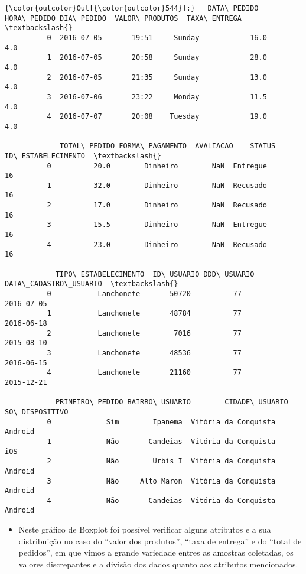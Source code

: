 \documentclass[11pt]{article}
\providecommand{\tightlist}{%
      \setlength{\itemsep}{0pt}\setlength{\parskip}{0pt}}
\begin{document}
\begin{Verbatim}[commandchars=\\\{\}]
{\color{outcolor}Out[{\color{outcolor}544}]:}   DATA\_PEDIDO HORA\_PEDIDO DIA\_PEDIDO  VALOR\_PRODUTOS  TAXA\_ENTREGA  \textbackslash{}
          0  2016-07-05       19:51     Sunday            16.0           4.0   
          1  2016-07-05       20:58     Sunday            28.0           4.0   
          2  2016-07-05       21:35     Sunday            13.0           4.0   
          3  2016-07-06       23:22     Monday            11.5           4.0   
          4  2016-07-07       20:08    Tuesday            19.0           4.0   
          
             TOTAL\_PEDIDO FORMA\_PAGAMENTO  AVALIACAO    STATUS  ID\_ESTABELECIMENTO  \textbackslash{}
          0          20.0        Dinheiro        NaN  Entregue                  16   
          1          32.0        Dinheiro        NaN  Recusado                  16   
          2          17.0        Dinheiro        NaN  Recusado                  16   
          3          15.5        Dinheiro        NaN  Entregue                  16   
          4          23.0        Dinheiro        NaN  Recusado                  16   
          
            TIPO\_ESTABELECIMENTO  ID\_USUARIO DDD\_USUARIO DATA\_CADASTRO\_USUARIO  \textbackslash{}
          0           Lanchonete       50720          77            2016-07-05   
          1           Lanchonete       48784          77            2016-06-18   
          2           Lanchonete        7016          77            2015-08-10   
          3           Lanchonete       48536          77            2016-06-15   
          4           Lanchonete       21160          77            2015-12-21   
          
            PRIMEIRO\_PEDIDO BAIRRO\_USUARIO        CIDADE\_USUARIO SO\_DISPOSITIVO  
          0             Sim        Ipanema  Vitória da Conquista        Android  
          1             Não       Candeias  Vitória da Conquista            iOS  
          2             Não        Urbis I  Vitória da Conquista        Android  
          3             Não     Alto Maron  Vitória da Conquista        Android  
          4             Não       Candeias  Vitória da Conquista        Android  
\end{Verbatim}
            
    \begin{itemize}
\tightlist
\item
  Neste gráfico de Boxplot foi possível verificar alguns atributos e a
  sua distribuição no caso do ``valor dos produtos'', ``taxa de
  entrega'' e do ``total de pedidos'', em que vimos a grande variedade
  entres as amostras coletadas, os valores discrepantes e a divisão dos
  dados quanto aos atributos mencionados.
\end{itemize}
\end{document}
